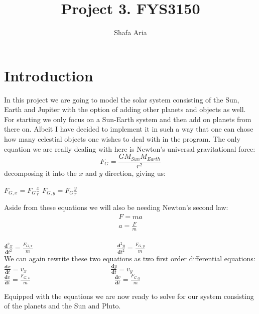 \documentclass{article}
\begin{document}
\title{Project 3. FYS3150}
\author{Shafa Aria}
\maketitle
\newpage
\section{Introduction}
In this project we are going to model the solar system consisting of the Sun, Earth and Jupiter with the option of adding other planets and objects as well. For starting we only focus on a Sun-Earth system and then add on planets from there on. Albeit I have decided to implement it in such a way that one can chose how many celestial objects one wishes to deal with in the program. The only equation we are really dealing with here is Newton's universal gravitational force:
$$F_G = \frac{GM_{Sun}M_{Earth}}{r^2}$$ decomposing it into the $x$ and $y$ direction, giving us:
\begin{center}
$F_{G,x} = F_G\frac{x}{r}$ \hspace{5cm} $F_{G,y} = F_G\frac{y}{r}$
\end{center}
Aside from these equations we will also be needing Newton's second law:
\begin{align*}
F = ma\\
a = \frac{F}{m}\\
\end{align*}
\begin{center}
$\frac{\mathbf{d}^2x}{\mathbf{d}t^2} = \frac{F_{G,x}}{m} \hspace{5cm} \frac{\mathbf{d}^2y}{\mathbf{d}t^2} = \frac{F_{G,y}}{m}$\\
We can again rewrite these two equations as two first order differential equations:\\
$\frac{\mathbf{d}x}{\mathbf{d}t} = v_x \hspace{5cm}  \frac{\mathbf{d}y}{\mathbf{d}t} = v_y$\\
\vspace{0.5cm}
$\frac{\mathbf{d}v}{\mathbf{d}t} = \frac{F_{G,x}}{m} \hspace{5cm}  \frac{\mathbf{d}v}{\mathbf{d}t} = \frac{F_{G,y}}{m}$
\end{center}
Equipped with the equations we are now ready to solve for our system consisting of the planets and the Sun and Pluto.
\end{document}
